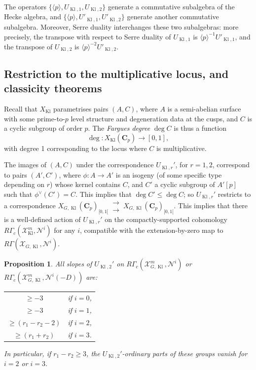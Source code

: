 \documentclass[cjm]{ipart}
\theoremstyle{plain}
\newtheorem{proposition}[theorem]{Proposition}
\theoremstyle{remark}
\DeclareMathOperator{\Kl}{Kl}
\newcommand{\CC}{\mathbf{C}}
\newcommand{\cN}{\mathcal{N}}
\newcommand{\cX}{\mathcal{X}}
\numberwithin{equation}{subsection}
\renewcommand{\le}{\leqslant}
\renewcommand{\ge}{\geqslant}
\begin{document}
  \begin{note}
   The operators $\{ \langle p \rangle, U_{\Kl, 1}, U_{\Kl, 2}\}$ generate a commutative subalgebra of the Hecke algebra, and $\{ \langle p \rangle, U'_{\Kl, 1}, U'_{\Kl, 2}\}$ generate another commutative subalgebra. Moreover, Serre duality interchanges these two subalgebras: more precisely, the transpose with respect to Serre duality of $U_{\Kl, 1}$ is $\langle p \rangle^{-1} U'_{\Kl, 1}$, and the transpose of $U_{\Kl, 2}$ is $\langle p \rangle^{-2} U'_{\Kl, 2}$.
  \end{note}


 \subsection{Restriction to the multiplicative locus, and classicity theorems}

  Recall that $X_{\Kl}$ parametrises pairs $(A, C)$, where $A$ is a semi-abelian surface with some prime-to-$p$ level structure and degeneration data at the cusps, and $C$ is a cyclic subgroup of order $p$. The \emph{Fargues degree} $\deg C$ is thus a function
  \[ \deg: X_{\Kl}(\CC_p)\to \left[0, 1\right], \]
   with degree 1 corresponding to the locus where $C$ is multiplicative.

  The images of $(A, C)$ under the correspondence $U_{\Kl, r}'$, for $r = 1, 2$, correspond to pairs $(A', C')$, where $\phi: A \to A'$ is an isogeny (of some specific type depending on $r$) whose kernel contains $C$, and $C'$ a cyclic subgroup of $A'[p]$ such that $\phi^\vee(C') = C$. This implies that $\deg C' \le \deg C$; so $U_{\Kl, r}'$ restricts to a correspondence $X_{G,\Kl}(\CC_p)_{[0, 1[} \,{\substack{\rightarrow \\ \rightarrow} }\,X_{G,\Kl}(\CC_p)_{[0, 1[}$. This implies that there is a well-defined action of $U_{\Kl, r}'$ on the compactly-supported cohomology $R\Gamma_c(\cX_{\Kl}^m, \cN^i)$ for any $i$, compatible with the extension-by-zero map to $R\Gamma(\cX_{G,\Kl}, \cN^i)$.


  \begin{proposition}
   \label{prop:slopeestimates}
   All slopes of $U_{\Kl, 2}'$ on $R\Gamma_c\left(\cX_{G,\Kl}^m, \cN^i\right)$ or $R\Gamma_c\left(\cX_{G,\Kl}^m, \cN^i(-D)\right)$ are:

   \begin{center}
   \begin{tabular}{c c}
      $ \ge -3$ & \quad if $i=0$,\\
      $ \ge -3$ & \quad if $i=1$,\\
      $ \ge (r_1 - r_2 - 2)$ & \quad if $i = 2$,\\
      $ \ge (r_1 + r_2)$ & \quad if $i = 3$.
    \end{tabular}
   \end{center}
   In particular, if $r_1 - r_2 \ge 3$, the $U_{\Kl, 2}'$-ordinary parts of these groups vanish for $i = 2$ or $i = 3$.
  \end{proposition}
\end{document}

